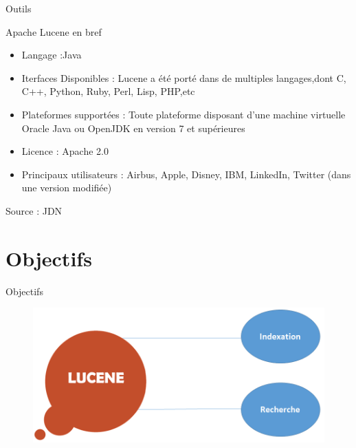 \documentclass[10pt]{beamer}
\begin{document}
\begin{frame}{Outils}
\begin{block}{Apache Lucene en bref}
\begin{itemize}
\item Langage :Java 
\item Iterfaces Disponibles : Lucene a été porté dans de multiples langages,dont C, C++, Python, Ruby, Perl, Lisp, PHP,etc
\item Plateformes supportées : Toute plateforme disposant d'une machine virtuelle Oracle Java ou OpenJDK en version 7 et supérieures 
\item Licence : Apache 2.0 
\item Principaux utilisateurs : Airbus, Apple, Disney, IBM, LinkedIn, Twitter (dans une version modifiée) 


\end{itemize}
\begin{flushright}
Source : JDN
\end{flushright}


\end{block}
\end{frame}

\section{Objectifs}
\begin{frame}{Objectifs}
\begin{figure}[t]
    \centering
    \includegraphics[height=\dimexpr9\textheight/16\relax]{33}
  \end{figure}
\end{frame}



\end{document}
